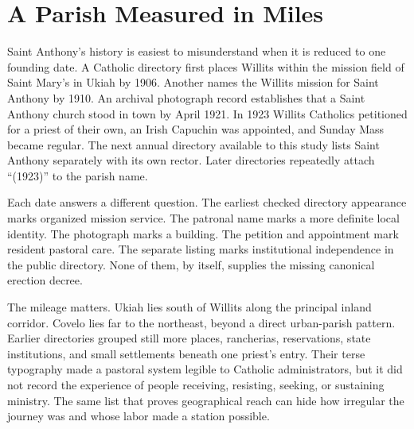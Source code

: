\section{A Parish Measured in Miles}

Saint Anthony's history is easiest to misunderstand when it is reduced to one founding date. A Catholic directory first places Willits within the mission field of Saint Mary's in Ukiah by 1906. Another names the Willits mission for Saint Anthony by 1910. An archival photograph record establishes that a Saint Anthony church stood in town by April 1921. In 1923 Willits Catholics petitioned for a priest of their own, an Irish Capuchin was appointed, and Sunday Mass became regular. The next annual directory available to this study lists Saint Anthony separately with its own rector. Later directories repeatedly attach ``(1923)'' to the parish name.

Each date answers a different question. The earliest checked directory appearance marks organized mission service. The patronal name marks a more definite local identity. The photograph marks a building. The petition and appointment mark resident pastoral care. The separate listing marks institutional independence in the public directory. None of them, by itself, supplies the missing canonical erection decree.


The mileage matters. Ukiah lies south of Willits along the principal inland corridor. Covelo lies far to the northeast, beyond a direct urban-parish pattern. Earlier directories grouped still more places, rancherias, reservations, state institutions, and small settlements beneath one priest's entry. Their terse typography made a pastoral system legible to Catholic administrators, but it did not record the experience of people receiving, resisting, seeking, or sustaining ministry. The same list that proves geographical reach can hide how irregular the journey was and whose labor made a station possible.

